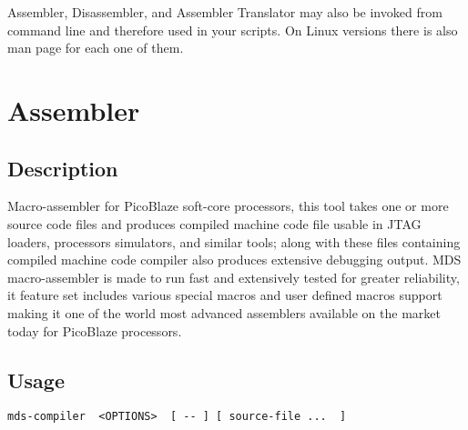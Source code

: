Assembler, Disassembler, and Assembler Translator may also be invoked from command line and therefore used in your scripts. On Linux versions there is also man page for each one of them.

\section{Assembler}
    \subsection{Description}
        Macro-assembler for PicoBlaze soft-core processors, this tool takes one or more source code files and produces compiled machine code file usable in JTAG loaders, processors simulators, and similar tools; along with these files containing compiled machine code compiler also produces extensive debugging output. MDS macro-assembler is made to run fast and extensively tested for greater reliability, it feature set includes various special macros and user defined macros support making it one of the world most advanced assemblers available on the market today for PicoBlaze processors.

    \subsection{Usage}
        \verb'mds-compiler  <OPTIONS>  [ -- ] [ source-file ...  ]'

